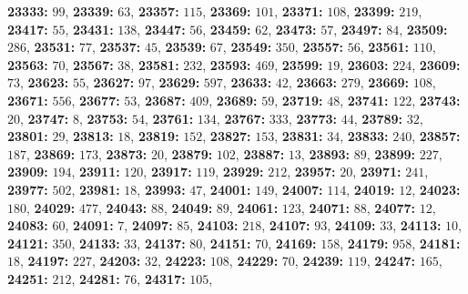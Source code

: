 \textsf{\bfseries 23333:} $99$, \textsf{\bfseries 23339:} $63$, \textsf{\bfseries 23357:} $115$, \textsf{\bfseries 23369:} $101$, \textsf{\bfseries 23371:} $108$, \textsf{\bfseries 23399:} $219$, \textsf{\bfseries 23417:} $55$, \textsf{\bfseries 23431:} $138$, \textsf{\bfseries 23447:} $56$, \textsf{\bfseries 23459:} $62$, \textsf{\bfseries 23473:} $57$, \textsf{\bfseries 23497:} $84$, \textsf{\bfseries 23509:} $286$, \textsf{\bfseries 23531:} $77$, \textsf{\bfseries 23537:} $45$, \textsf{\bfseries 23539:} $67$, \textsf{\bfseries 23549:} $350$, \textsf{\bfseries 23557:} $56$, \textsf{\bfseries 23561:} $110$, \textsf{\bfseries 23563:} $70$, \textsf{\bfseries 23567:} $38$, \textsf{\bfseries 23581:} $232$, \textsf{\bfseries 23593:} $469$, \textsf{\bfseries 23599:} $19$, \textsf{\bfseries 23603:} $224$, \textsf{\bfseries 23609:} $73$, \textsf{\bfseries 23623:} $55$, \textsf{\bfseries 23627:} $97$, \textsf{\bfseries 23629:} $597$, \textsf{\bfseries 23633:} $42$, \textsf{\bfseries 23663:} $279$, \textsf{\bfseries 23669:} $108$, \textsf{\bfseries 23671:} $556$, \textsf{\bfseries 23677:} $53$, \textsf{\bfseries 23687:} $409$, \textsf{\bfseries 23689:} $59$, \textsf{\bfseries 23719:} $48$, \textsf{\bfseries 23741:} $122$, \textsf{\bfseries 23743:} $20$, \textsf{\bfseries 23747:} $8$, \textsf{\bfseries 23753:} $54$, \textsf{\bfseries 23761:} $134$, \textsf{\bfseries 23767:} $333$, \textsf{\bfseries 23773:} $44$, \textsf{\bfseries 23789:} $32$, \textsf{\bfseries 23801:} $29$, \textsf{\bfseries 23813:} $18$, \textsf{\bfseries 23819:} $152$, \textsf{\bfseries 23827:} $153$, \textsf{\bfseries 23831:} $34$, \textsf{\bfseries 23833:} $240$, \textsf{\bfseries 23857:} $187$, \textsf{\bfseries 23869:} $173$, \textsf{\bfseries 23873:} $20$, \textsf{\bfseries 23879:} $102$, \textsf{\bfseries 23887:} $13$, \textsf{\bfseries 23893:} $89$, \textsf{\bfseries 23899:} $227$, \textsf{\bfseries 23909:} $194$, \textsf{\bfseries 23911:} $120$, \textsf{\bfseries 23917:} $119$, \textsf{\bfseries 23929:} $212$, \textsf{\bfseries 23957:} $20$, \textsf{\bfseries 23971:} $241$, \textsf{\bfseries 23977:} $502$, \textsf{\bfseries 23981:} $18$, \textsf{\bfseries 23993:} $47$, \textsf{\bfseries 24001:} $149$, \textsf{\bfseries 24007:} $114$, \textsf{\bfseries 24019:} $12$, \textsf{\bfseries 24023:} $180$, \textsf{\bfseries 24029:} $477$, \textsf{\bfseries 24043:} $88$, \textsf{\bfseries 24049:} $89$, \textsf{\bfseries 24061:} $123$, \textsf{\bfseries 24071:} $88$, \textsf{\bfseries 24077:} $12$, \textsf{\bfseries 24083:} $60$, \textsf{\bfseries 24091:} $7$, \textsf{\bfseries 24097:} $85$, \textsf{\bfseries 24103:} $218$, \textsf{\bfseries 24107:} $93$, \textsf{\bfseries 24109:} $33$, \textsf{\bfseries 24113:} $10$, \textsf{\bfseries 24121:} $350$, \textsf{\bfseries 24133:} $33$, \textsf{\bfseries 24137:} $80$, \textsf{\bfseries 24151:} $70$, \textsf{\bfseries 24169:} $158$, \textsf{\bfseries 24179:} $958$, \textsf{\bfseries 24181:} $18$, \textsf{\bfseries 24197:} $227$, \textsf{\bfseries 24203:} $32$, \textsf{\bfseries 24223:} $108$, \textsf{\bfseries 24229:} $70$, \textsf{\bfseries 24239:} $119$, \textsf{\bfseries 24247:} $165$, \textsf{\bfseries 24251:} $212$, \textsf{\bfseries 24281:} $76$, \textsf{\bfseries 24317:} $105$, 
